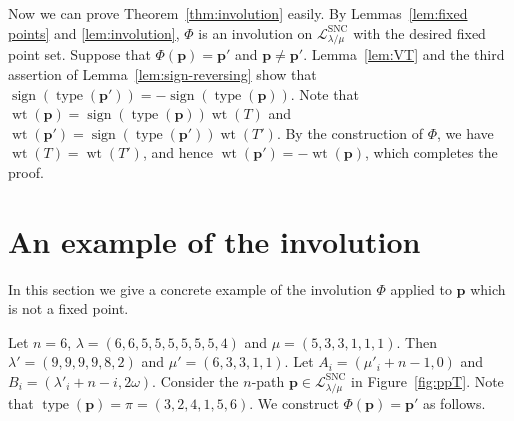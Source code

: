 \documentclass{amsart}
\numberwithin{equation}{section}
\theoremstyle{definition}
\newcommand\type{\operatorname{type}}
\newcommand\LL{\mathcal{L}_\lm}
\newcommand\lsnc{\LL^{\operatorname{SNC}}}
\newcommand\pp{\mathbf{p}}
\newcommand\sign{\operatorname{sign}}
\newcommand\lm{{\lambda/\mu}}
\newcommand\wt{\operatorname{wt}}
\begin{document}
Now we can prove Theorem~\ref{thm:involution} easily. By Lemmas~\ref{lem:fixed
  points} and \ref{lem:involution}, $\Phi$ is an involution on $\lsnc$ with the
desired fixed point set. Suppose that $\Phi(\pp)=\pp'$ and $\pp\ne\pp'$.
Lemma~\ref{lem:VT} and the third assertion of Lemma~\ref{lem:sign-reversing}
show that $\sign(\type(\pp')) = -\sign(\type(\pp))$. Note that
$\wt(\pp)=\sign(\type(\pp))\wt(T)$ and $\wt(\pp')=\sign(\type(\pp'))\wt(T')$. By
the construction of $\Phi$, we have $\wt(T)=\wt(T')$, and hence
$\wt(\pp')=-\wt(\pp)$, which completes the proof.





\section{An example of the involution}
\label{sec:example-phi}

In this section we give a concrete example of the involution $\Phi$ applied to
$\pp$ which is not a fixed point.


  Let $n=6$, $\lambda=(6,6,5,5,5,5,5,5,4)$ and $\mu=(5,3,3,1,1,1)$. Then
  $\lambda'=(9,9,9,9,8,2)$ and $\mu'=(6,3,3,1,1)$. Let $A_i=(\mu'_i+n-1,0)$ and
  $B_i=(\lambda'_i+n-i,2\omega)$. Consider the $n$-path $\pp\in \lsnc$ in
  Figure~\ref{fig:ppT}. Note that $\type(\pp)=\pi=(3,2,4,1,5,6)$. We construct
  $\Phi(\pp)=\pp'$ as follows.
\end{document}
